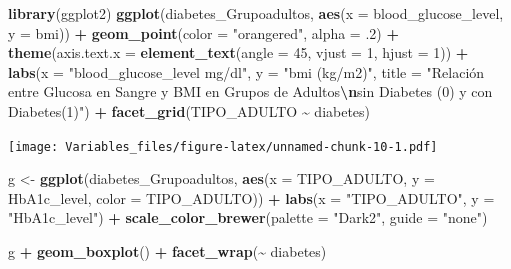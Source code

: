\documentclass[
]{article}
\newenvironment{Shaded}{\begin{snugshade}}{\end{snugshade}}
\newcommand{\AttributeTok}[1]{\textcolor[rgb]{0.13,0.29,0.53}{#1}}
\newcommand{\DecValTok}[1]{\textcolor[rgb]{0.00,0.00,0.81}{#1}}
\newcommand{\FunctionTok}[1]{\textcolor[rgb]{0.13,0.29,0.53}{\textbf{#1}}}
\newcommand{\NormalTok}[1]{#1}
\newcommand{\OtherTok}[1]{\textcolor[rgb]{0.56,0.35,0.01}{#1}}
\newcommand{\SpecialCharTok}[1]{\textcolor[rgb]{0.81,0.36,0.00}{\textbf{#1}}}
\newcommand{\StringTok}[1]{\textcolor[rgb]{0.31,0.60,0.02}{#1}}
\begin{document}
\begin{Shaded}
\begin{Highlighting}[]
\FunctionTok{library}\NormalTok{(ggplot2)}
\FunctionTok{ggplot}\NormalTok{(diabetes\_Grupoadultos, }\FunctionTok{aes}\NormalTok{(}\AttributeTok{x =}\NormalTok{ blood\_glucose\_level, }\AttributeTok{y =}\NormalTok{ bmi)) }\SpecialCharTok{+}
  \FunctionTok{geom\_point}\NormalTok{(}\AttributeTok{color =} \StringTok{"orangered"}\NormalTok{, }\AttributeTok{alpha =}\NormalTok{ .}\DecValTok{2}\NormalTok{) }\SpecialCharTok{+}
  \FunctionTok{theme}\NormalTok{(}\AttributeTok{axis.text.x =} \FunctionTok{element\_text}\NormalTok{(}\AttributeTok{angle =} \DecValTok{45}\NormalTok{, }\AttributeTok{vjust =} \DecValTok{1}\NormalTok{, }\AttributeTok{hjust =} \DecValTok{1}\NormalTok{)) }\SpecialCharTok{+}
  \FunctionTok{labs}\NormalTok{(}\AttributeTok{x =} \StringTok{"blood\_glucose\_level mg/dl"}\NormalTok{, }\AttributeTok{y =} \StringTok{"bmi (kg/m2)"}\NormalTok{, }\AttributeTok{title =} \StringTok{"Relación entre Glucosa en Sangre y BMI en Grupos de Adultos}\SpecialCharTok{\textbackslash{}n}\StringTok{sin Diabetes (0) y con Diabetes(1)"}\NormalTok{) }\SpecialCharTok{+}
  \FunctionTok{facet\_grid}\NormalTok{(TIPO\_ADULTO }\SpecialCharTok{\textasciitilde{}}\NormalTok{ diabetes)}
\end{Highlighting}
\end{Shaded}

\texttt{[image: Variables\_files/figure-latex/unnamed-chunk-10-1.pdf]}

\begin{Shaded}
\begin{Highlighting}[]
\NormalTok{g }\OtherTok{\textless{}{-}}
  \FunctionTok{ggplot}\NormalTok{(diabetes\_Grupoadultos, }\FunctionTok{aes}\NormalTok{(}\AttributeTok{x =}\NormalTok{ TIPO\_ADULTO, }\AttributeTok{y =}\NormalTok{ HbA1c\_level,}
                   \AttributeTok{color =}\NormalTok{ TIPO\_ADULTO)) }\SpecialCharTok{+}
    \FunctionTok{labs}\NormalTok{(}\AttributeTok{x =} \StringTok{"TIPO\_ADULTO"}\NormalTok{, }\AttributeTok{y =} \StringTok{"HbA1c\_level"}\NormalTok{) }\SpecialCharTok{+}
    \FunctionTok{scale\_color\_brewer}\NormalTok{(}\AttributeTok{palette =} \StringTok{"Dark2"}\NormalTok{, }\AttributeTok{guide =} \StringTok{"none"}\NormalTok{)}

\NormalTok{g }\SpecialCharTok{+} \FunctionTok{geom\_boxplot}\NormalTok{() }\SpecialCharTok{+} \FunctionTok{facet\_wrap}\NormalTok{(}\SpecialCharTok{\textasciitilde{}}\NormalTok{ diabetes)}
\end{Highlighting}
\end{Shaded}
\end{document}
